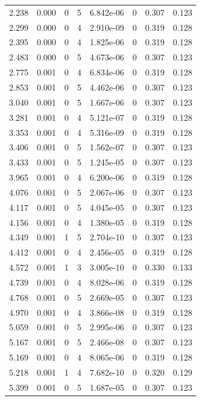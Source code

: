 \documentclass[preview]{standalone}
\begin{document}
{{\begin{tabular}{L{1.2cm}C{1.2cm} C{0.3cm}C{0.5cm} C{1.4cm}C{1.4cm} C{1.4cm}C{1.4cm}}
  2.238  &  0.000  & 0     &  5 &  6.842e-06  & 0  & 0.307 &  0.123   \\ 
  2.299  &  0.000  & 0     &  4 &  2.910e-09  & 0  & 0.319 &  0.128   \\ 
  2.395  &  0.000  & 0     &  4 &  1.825e-06  & 0  & 0.319 &  0.128   \\ 
  2.483  &  0.000  & 0     &  5 &  4.673e-06  & 0  & 0.307 &  0.123   \\ 
  2.775  &  0.001  & 0     &  4 &  6.834e-06  & 0  & 0.319 &  0.128   \\ 
  2.853  &  0.001  & 0     &  5 &  4.462e-06  & 0  & 0.307 &  0.123   \\ 
  3.040  &  0.001  & 0     &  5 &  1.667e-06  & 0  & 0.307 &  0.123   \\ 
  3.281  &  0.001  & 0     &  4 &  5.121e-07  & 0  & 0.319 &  0.128   \\ 
  3.353  &  0.001  & 0     &  4 &  5.316e-09  & 0  & 0.319 &  0.128   \\ 
  3.406  &  0.001  & 0     &  5 &  1.562e-07  & 0  & 0.307 &  0.123   \\ 
  3.433  &  0.001  & 0     &  5 &  1.245e-05  & 0  & 0.307 &  0.123   \\ 
  3.965  &  0.001  & 0     &  4 &  6.200e-06  & 0  & 0.319 &  0.128   \\ 
  4.076  &  0.001  & 0     &  5 &  2.067e-06  & 0  & 0.307 &  0.123   \\ 
  4.117  &  0.001  & 0     &  5 &  4.045e-05  & 0  & 0.307 &  0.123   \\ 
  4.156  &  0.001  & 0     &  4 &  1.380e-05  & 0  & 0.319 &  0.128   \\ 
  4.349  &  0.001  & 1     &  5 &  2.704e-10  & 0  & 0.307 &  0.123   \\ 
  4.412  &  0.001  & 0     &  4 &  2.456e-05  & 0  & 0.319 &  0.128   \\ 
  4.572  &  0.001  & 1     &  3 &  3.005e-10  & 0  & 0.330 &  0.133   \\ 
  4.739  &  0.001  & 0     &  4 &  8.028e-06  & 0  & 0.319 &  0.128   \\ 
  4.768  &  0.001  & 0     &  5 &  2.669e-05  & 0  & 0.307 &  0.123   \\ 
  4.970  &  0.001  & 0     &  4 &  3.866e-08  & 0  & 0.319 &  0.128   \\ 
  5.059  &  0.001  & 0     &  5 &  2.995e-06  & 0  & 0.307 &  0.123   \\ 
  5.167  &  0.001  & 0     &  5 &  2.466e-08  & 0  & 0.307 &  0.123   \\ 
  5.169  &  0.001  & 0     &  4 &  8.065e-06  & 0  & 0.319 &  0.128   \\ 
  5.218  &  0.001  & 1     &  4 &  7.682e-10  & 0  & 0.320 &  0.129   \\ 
  5.399  &  0.001  & 0     &  5 &  1.687e-05  & 0  & 0.307 &  0.123   \\ 
\hline 
\end{tabular} 

}}
\end{document}
